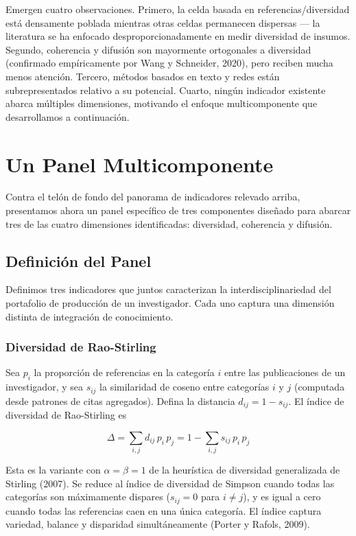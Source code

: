 \documentclass[
]{article}
\begin{document}
Emergen cuatro observaciones. Primero, la celda basada en
referencias/diversidad está densamente poblada mientras otras celdas
permanecen dispersas --- la literatura se ha enfocado
desproporcionadamente en medir diversidad de insumos. Segundo,
coherencia y difusión son mayormente ortogonales a diversidad
(confirmado empíricamente por Wang y Schneider, 2020), pero reciben
mucha menos atención. Tercero, métodos basados en texto y redes están
subrepresentados relativo a su potencial. Cuarto, ningún indicador
existente abarca múltiples dimensiones, motivando el enfoque
multicomponente que desarrollamos a continuación.

\hypertarget{un-panel-multicomponente}{%
\section{Un Panel Multicomponente}\label{un-panel-multicomponente}}

Contra el telón de fondo del panorama de indicadores relevado arriba,
presentamos ahora un panel específico de tres componentes diseñado para
abarcar tres de las cuatro dimensiones identificadas: diversidad,
coherencia y difusión.

\hypertarget{definiciuxf3n-del-panel}{%
\subsection{Definición del Panel}\label{definiciuxf3n-del-panel}}

Definimos tres indicadores que juntos caracterizan la
interdisciplinariedad del portafolio de producción de un investigador.
Cada uno captura una dimensión distinta de integración de conocimiento.

\hypertarget{diversidad-de-rao-stirling}{%
\subsubsection{Diversidad de
Rao-Stirling}\label{diversidad-de-rao-stirling}}

Sea \(p_i\) la proporción de referencias en la categoría \(i\) entre las
publicaciones de un investigador, y sea \(s_{ij}\) la similaridad de
coseno entre categorías \(i\) y \(j\) (computada desde patrones de citas
agregados). Defina la distancia \(d_{ij} = 1 - s_{ij}\). El índice de
diversidad de Rao-Stirling es

\[\Delta = \sum_{i,j} d_{ij}\, p_i \, p_j = 1 - \sum_{i,j} s_{ij}\, p_i \, p_j\]

Esta es la variante con \(\alpha = \beta = 1\) de la heurística de
diversidad generalizada de Stirling (2007). Se reduce al índice de
diversidad de Simpson cuando todas las categorías son máximamente
dispares (\(s_{ij} = 0\) para \(i \neq j\)), y es igual a cero cuando
todas las referencias caen en una única categoría. El índice captura
variedad, balance y disparidad simultáneamente (Porter y Rafols, 2009).
\end{document}
